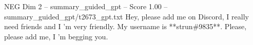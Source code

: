 \begin{textsample}{NEG Dim 2 – summary\_guided\_gpt – Score 1.00 – summary\_guided\_gpt/t2673\_gpt.txt}  \label{ex:f2_neg_036}
Hey, please add me on Discord, I really need friends and I ’m very friendly.
My username is **strun\#9835**.
Please, please add me, I ’m begging you.

\end{textsample}
